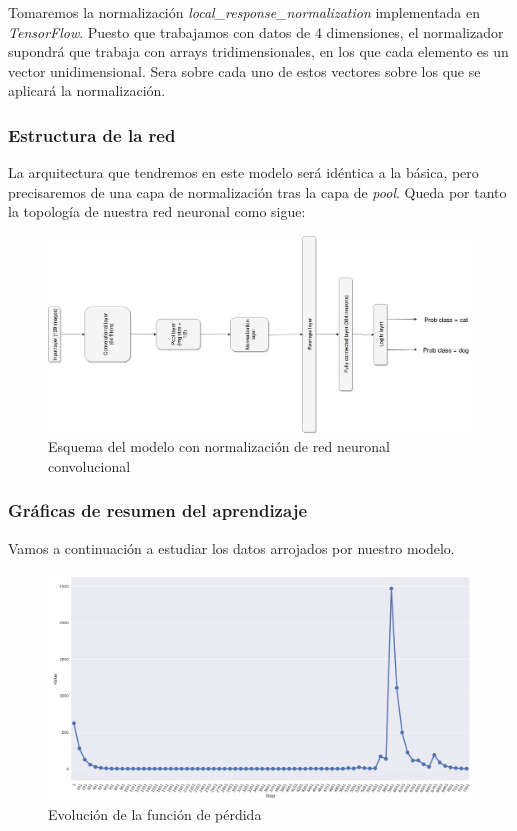 \documentclass[11pt]{article}
\theoremstyle{plain}
\theoremstyle{definition}
\begin{document}
Tomaremos la normalización \textit{local\_response\_normalization}
implementada en \textit{TensorFlow}. Puesto que trabajamos con datos
de 4 dimensiones, el normalizador supondrá que trabaja con arrays 
tridimensionales, en los que cada elemento es un vector unidimensional.
Sera sobre cada uno de estos vectores sobre los que se aplicará la 
normalización.

\subsubsection{Estructura de la red}

La arquitectura que tendremos en este modelo será idéntica a la
básica, pero precisaremos de una capa de normalización tras la 
capa de \textit{pool}. Queda por tanto la topología de nuestra
red neuronal como sigue:


\begin{figure}[H]
  \centering
  \includegraphics[width=.8\textwidth]{imgs/norm_model.png}  
  \caption{Esquema del modelo con normalización de red neuronal convolucional}
\end{figure}



\subsubsection{Gráficas de resumen del aprendizaje}


Vamos a continuación a estudiar los datos arrojados por nuestro
modelo.

\begin{figure}[H]
  \centering \includegraphics[width=.95\textwidth]{imgs/loss_norm}
  \caption{Evolución de la función de pérdida}
\end{figure}
\end{document}
